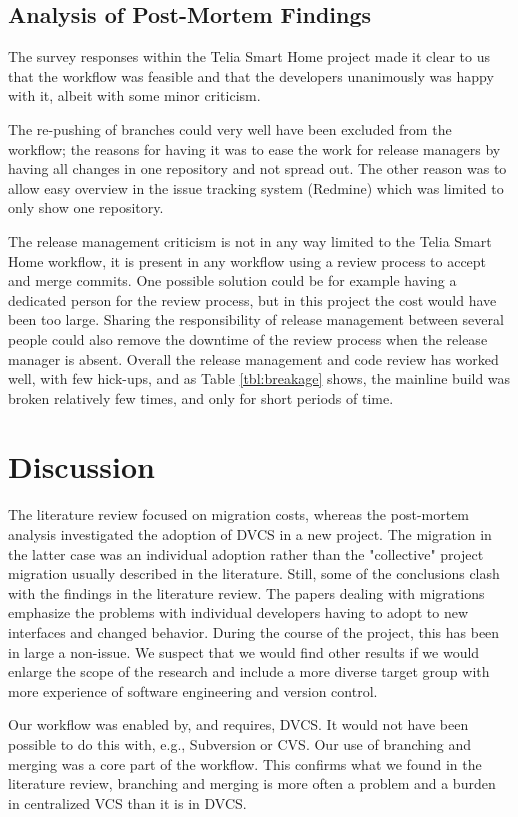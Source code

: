 \documentclass{llncs}
\begin{document}
\subsection{Analysis of Post-Mortem Findings}
The survey responses within the Telia Smart Home project made it clear
to us that the workflow was feasible and that the developers
unanimously was happy with it, albeit with some minor criticism.

The re-pushing of branches could very well have been excluded from the
workflow; the reasons for having it was to ease the work for release
managers by having all changes in one repository and not spread
out. The other reason was to allow easy overview in the issue tracking
system (Redmine) which was limited to only show one repository.

The release management criticism is not in any way limited to the
Telia Smart Home workflow, it is present in any workflow using a
review process to accept and merge commits. One possible solution
could be for example having a dedicated person for the review process,
but in this project the cost would have been too large. Sharing the
responsibility of release management between several people could also
remove the downtime of the review process when the release manager is
absent. Overall the release management and code review has worked
well, with few hick-ups, and as Table \ref{tbl:breakage} shows, the
mainline build was broken relatively few times, and only for short
periods of time.

\section{Discussion}

The literature review focused on migration costs, whereas the
post-mortem analysis investigated the adoption of DVCS in a new
project. The migration in the latter case was an individual adoption
rather than the "collective" project migration usually described in
the literature. Still, some of the conclusions clash with the findings
in the literature review. The papers dealing with migrations
emphasize the problems with individual developers having to adopt to
new interfaces and changed behavior. During the course of the project,
this has been in large a non-issue. We suspect that we would find
other results if we would enlarge the scope of the research and
include a more diverse target group with more experience of software
engineering and version control.

Our workflow was enabled by, and requires, DVCS. It would not have
been possible to do this with, e.g., Subversion or CVS. Our use of
branching and merging was a core part of the workflow. This confirms
what we found in the literature review, branching and merging is more
often a problem and a burden in centralized VCS than it is in DVCS.
\end{document}
